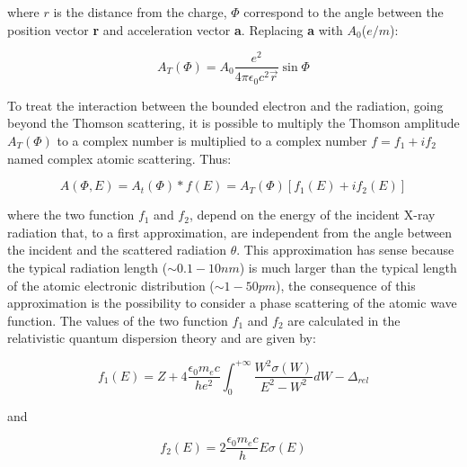 \begin{flushleft}
where $r $ is the distance from the charge, $\Phi $ correspond to the angle between the position vector \textbf{r} and acceleration vector \textbf{a}. Replacing \textbf{a} with $A_0 $($e / m $):
\end{flushleft}

\begin{equation}
A_T(\Phi) = A_0 \frac{e^2}{4 \pi \epsilon_0 c^2 \vec{r}} \sin \Phi
\label{eq: At2}
\end{equation}

\begin{flushleft}
To treat the interaction between the bounded electron and the radiation, going beyond the Thomson scattering, it is possible to multiply the Thomson amplitude $A_T (\Phi) $ to a complex number  is multiplied to a complex number $f = f_1 + if_2 $ named complex atomic scattering. Thus:
\end{flushleft}

\begin{equation}
A(\Phi, E) = A_t(\Phi) * f(E) = A_T(\Phi) [f_1(E) + if_2(E)]
\label{eq: A(fi, E)}
\end{equation}

\begin{flushleft}
where the two function $f_1 $ and $f_2 $, depend on the energy of the incident X-ray radiation that, to a first approximation, are independent from the angle between the incident and the scattered radiation $\theta $. This approximation has sense because the typical radiation length ($\sim 0.1-10nm $) is much larger than the typical length of the atomic electronic distribution ($\sim 1-50pm $), the consequence of this approximation is the possibility to consider a phase scattering of the atomic wave function. The values of the two function  $f_1 $ and $f_2 $ are calculated in the relativistic quantum dispersion theory \cite{cromer1970relativistic} and are given by:
\end{flushleft}

\begin{equation}
f_1(E) = Z + 4 \frac{\epsilon_0 m_e c}{h e^2} \int_{0}^{+ \infty}\frac{W^2 \sigma(W)}{E^2 - W^2} dW - \Delta_{rel}
\label{eq: f1}
\end{equation}

\begin{flushleft}
and
\end{flushleft}

\begin{equation}
f_2(E) = 2 \frac{\epsilon_0 m_e c}{h} E \sigma(E)
\label{eq: f2}
\end{equation}


